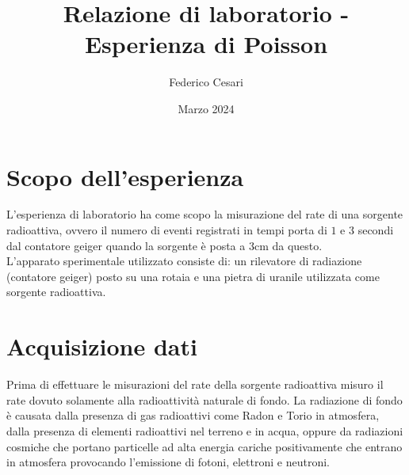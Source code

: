 \documentclass{article}
\title{Relazione di laboratorio - Esperienza di Poisson}
\author{Federico Cesari}
\date{Marzo 2024}
\begin{document}






\section{Scopo dell'esperienza}
L'esperienza di laboratorio ha come scopo la misurazione del rate di una sorgente radioattiva, ovvero il numero di eventi registrati in tempi porta di $1$ e $3$ secondi dal contatore geiger quando la sorgente è posta a \(3\)cm da questo. \\

\noindent
L'apparato sperimentale utilizzato consiste di: un rilevatore di radiazione (contatore geiger) posto su una rotaia e una pietra di uranile utilizzata come sorgente radioattiva.

\section{Acquisizione dati}
Prima di effettuare le misurazioni del rate della sorgente radioattiva misuro il rate dovuto solamente alla radioattività naturale di fondo. La radiazione di fondo è causata dalla presenza di gas radioattivi come Radon e Torio in atmosfera, dalla presenza di elementi radioattivi nel terreno e in acqua, oppure da radiazioni cosmiche che portano  particelle ad alta energia cariche positivamente che entrano in atmosfera provocando l'emissione di fotoni, elettroni e neutroni. 
\end{document}
